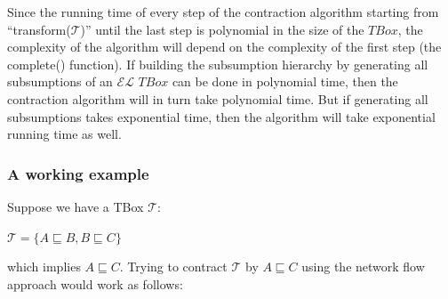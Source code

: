 Since the running time of every step of the contraction algorithm starting from ``transform($ \mathcal{T} $)'' until the last step is polynomial in the size of the $TBox$, the complexity of the algorithm will depend on the complexity of the first step (the complete() function). If building the subsumption hierarchy by generating all subsumptions of an $\mathcal{EL}$ $TBox$ can be done in polynomial time, then the contraction algorithm will in turn take polynomial time. But if generating all subsumptions takes exponential time, then the algorithm will take exponential running time as well.

\subsubsection{A working example}
Suppose we have a TBox $\mathcal{T}$:
\begin{center}
$\mathcal{T} = \lbrace A \sqsubseteq B, B \sqsubseteq C \rbrace$
\end{center}
which implies $A \sqsubseteq C$. Trying to contract $\mathcal{T}$ by $A \sqsubseteq C$ using the network flow approach would work as follows:

